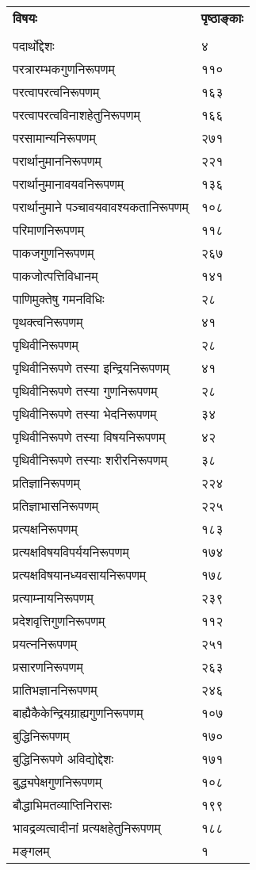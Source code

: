 \documentclass[11pt, openany]{book}
\begin{document}
\newpage
\noindent
\begin{tabular}{m{28em} m{2em}}
\textbf{विषयः} & \textbf{पृष्ठाङ्काः}\\
 &\\ 
 पदार्थोद्देशः & ४\\
परत्रारम्भकगुणनिरूपणम् &११०\\
परत्वापरत्वनिरूपणम् &१६३\\
परत्वापरत्वविनाशहेतुनिरूपणम् &१६६\\
परसामान्यनिरूपणम् &२७१\\
परार्थानुमाननिरूपणम् &२२१\\
परार्थानुमानावयवनिरूपणम् &१३६\\
परार्थानुमाने पञ्चावयवावश्यकतानिरूपणम् &१०८\\
परिमाणनिरूपणम् &११८\\
पाकजगुणनिरूपणम् &२६७\\
पाकजोत्पत्तिविधानम् &१४१\\
पाणिमुक्तेषु गमनविधिः &२८\\
पृथक्त्वनिरूपणम् &४१\\
पृथिवीनिरूपणम् &२८\\
पृथिवीनिरूपणे तस्या इन्द्रियनिरूपणम् &४१\\
पृथिवीनिरूपणे तस्या गुणनिरूपणम् &२८\\
पृथिवीनिरूपणे तस्या भेदनिरूपणम् &३४\\
पृथिवीनिरूपणे तस्या विषयनिरूपणम् &४२\\
पृथिवीनिरूपणे तस्याः शरीरनिरूपणम् &३८\\
प्रतिज्ञानिरूपणम् &२२४\\
प्रतिज्ञाभासनिरूपणम् &२२५\\
प्रत्यक्षनिरूपणम् &१८३\\
प्रत्यक्षविषयविपर्ययनिरूपणम् &१७४\\
प्रत्यक्षविषयानध्यवसायनिरूपणम् &१७८\\
प्रत्याम्नायनिरूपणम् &२३९\\
प्रदेशवृत्तिगुणनिरूपणम् &११२\\
प्रयत्ननिरूपणम् &२५१\\
प्रसारणनिरूपणम् &२६३\\
प्रातिभज्ञाननिरूपणम् &२४६\\
बाह्यैकैकेन्द्रियग्राह्यगुणनिरूपणम् &१०७\\
बुद्धिनिरूपणम् &१७०\\
बुद्धिनिरूपणे अविद्योद्देशः &१७१\\
बुद्ध्यपेक्षगुणनिरूपणम् &१०८\\
बौद्धाभिमतव्याप्तिनिरासः &१९९\\
भावद्रव्यत्वादीनां प्रत्यक्षहेतुनिरूपणम् &१८८\\
मङ्गलम् &१
\end{tabular}
\end{document}
